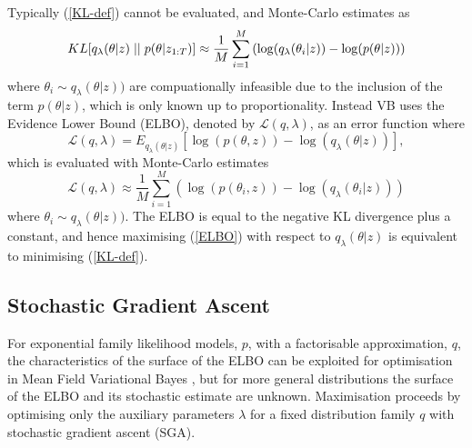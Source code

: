 \documentclass[12pt,a4paper]{article}\usepackage[]{graphicx}\usepackage[]{color}
\begin{document}
Typically (\ref{KL-def}) cannot be evaluated, and Monte-Carlo estimates as
\begin{equation}
\label{KL-MC}
KL[q_{\lambda}(\theta | z)\hspace{.1cm}||\hspace{.1cm}p(\theta | z_{1:T})] \approx \frac{1}{M}\sum_{i=1}^M \left(\log(q_{\lambda}(\theta_i |z)) - \log(p(\theta | z)) \right)
\end{equation}
where $\theta_i \sim q_{\lambda}(\theta |z))$ are compuationally infeasible due to the inclusion of the term $p(\theta | z)$, which is only known up to proportionality. Instead VB uses the Evidence Lower Bound (ELBO), denoted by $\mathcal{L}(q, \lambda)$, as an error function where
\begin{equation}
\label{ELBO}
\mathcal{L}(q, \lambda) = E_{q_{\lambda}(\theta |z)} \left[\log(p(\theta, z)) - \log(q_{\lambda}(\theta |z))\right],
\end{equation}
which is evaluated with Monte-Carlo estimates
\begin{equation}
\label{ELBO-MC}
\mathcal{L}(q, \lambda) \approx \frac{1}{M} \sum_{i=1}^M \left(\log(p(\theta_i, z)) - \log(q_{\lambda}(\theta_i |z)) \right)
\end{equation}
where $\theta_i \sim q_{\lambda}(\theta |z))$. The ELBO is equal to the negative KL divergence plus a constant, and hence maximising (\ref{ELBO}) with respect to $q_{\lambda}(\theta | z)$ is equivalent to minimising (\ref{KL-def}).

\subsection{Stochastic Gradient Ascent}
\label{subsec:SGA}
For exponential family likelihood models, $p$, with a factorisable approximation, $q$, the characteristics of the surface of the ELBO can be exploited for optimisation in Mean Field Variational Bayes \citep{Ghahramani2000, Wainwright2008}, but for more general distributions the surface of the ELBO and its stochastic estimate are unknown. Maximisation proceeds by optimising only the auxiliary parameters $\lambda$ for a fixed distribution family $q$ with stochastic gradient ascent (SGA).
\\
\end{document}
